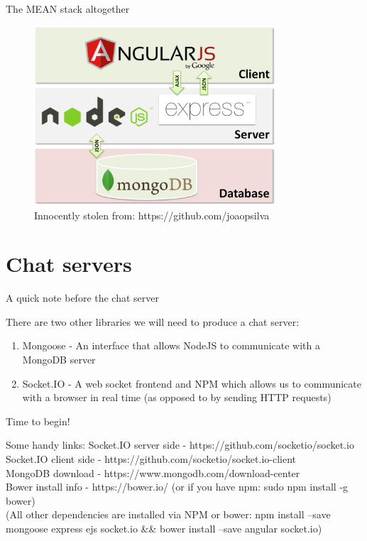 \documentclass{beamer}
\begin{document}
\begin{frame}{The MEAN stack altogether}

\begin{figure}[h]
\includegraphics[width=0.8\textwidth]{mean-diagram}
\caption{Innocently stolen from: https://github.com/joaopsilva}
\end{figure}

\end{frame}
\section{Chat servers}
\begin{frame}{A quick note before the chat server}

There are two other libraries we will need to produce a chat server:
\begin{enumerate}
  \item Mongoose \pause - An interface that allows NodeJS to communicate with a MongoDB server \pause
  \item Socket.IO \pause - A web socket frontend and NPM which allows us to communicate with a browser in real time (as opposed to by sending HTTP requests)
\end{enumerate}

\end{frame}

\begin{frame}{Time to begin!}

Some handy links:
Socket.IO server side - https://github.com/socketio/socket.io\\
Socket.IO client side - https://github.com/socketio/socket.io-client\\
MongoDB download - https://www.mongodb.com/download-center\\
Bower install info - https://bower.io/ (or if you have npm: sudo npm install -g bower) \\
(All other dependencies are installed via NPM or bower: npm install --save mongoose express ejs socket.io \&\& bower install --save angular socket.io)

\end{frame}
\end{document}
